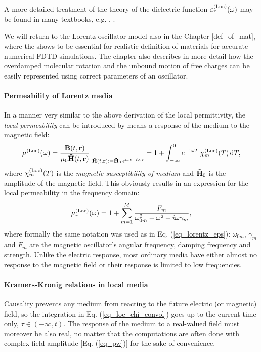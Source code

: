 A more detailed treatment of the theory of the dielectric function $\varepsilon^{\rm(Loc)}_r(\omega)$ may be found in many textbooks, e.g. \cite[p. 454]{klingshirn2007semiconductor}, \cite{dresselhaus1966optical}. 

We will return to the Lorentz oscillator model also in the Chapter \ref{def_of_mat}, where the shows to be essential for realistic definition of materials for accurate numerical FDTD simulations. The chapter also describes in more detail how the overdamped molecular rotation and the unbound motion of free charges can be easily represented using correct parameters of an oscillator.
\paragraph{Permeability of Lorentz media}  %
In a manner very similar to the above derivation of the local permittivity, the \textit{local permeability} can be introduced by means a response of the medium to the magnetic field:
\begin{equation} \mu^{\rm(Loc)}(\omega) = \frac{\mathbf{B}(t,{\mathbf{r}})}{\mu_0\mathbf{\tilde{H}}(t,{\mathbf{r}})} \biggr|_{\mathbf{\tilde{H}}(t, {\mathbf{r}}) := \mathbf{\tilde{H}}_0 \, e^{{\mathrm i}\omega t - {\mathrm i}{\mathbf{k}}\cdot{\mathbf{r}}}} = 1 + \int_{-\infty}^{0} e^{-{\mathrm i}\omega T} \,\chi_m^{\rm(Loc)}(T) \,\mbox{d}T, \label{eq_mu_loc}\end{equation}
where $\chi_m^{\rm(Loc)}(T)$ is the \textit{magnetic susceptibility of medium} and $\mathbf{\tilde{H}}_0$ is the amplitude of the magnetic field. This obviously results in an expression for the local permeability in the frequency domain:
\begin{equation} \mu^{\rm(Loc)}_r(\omega) = 1 + \sum_{m=1}^M \frac{F_m}{\omega_{0m}^2 - \omega^2 + i\omega\gamma_m}, \label{eq_lorentz_mu}\end{equation} %
where formally the same notation was used as in  Eq. (\ref{eq_lorentz_eps}): $\omega_{0m}$, $\gamma_m$ and $F_m$ are the magnetic oscillator's angular frequency, damping frequency and strength. Unlike the electric response, most ordinary media have either almost no response to the magnetic field %
or their response is limited to low frequencies.

\paragraph{Kramers-Kronig relations in local media}%
Causality prevents any medium from reacting to the future electric (or magnetic) field, so the integration in Eq. (\ref{eq_loc_chi_convol}) goes up to the current time only, $\tau \in (-\infty, t)$. The response of the medium to a real-valued field must moreover be also real, no matter that the computations are often done with complex field amplitude [Eq. (\ref{eq_pw})] for the sake of convenience. 

